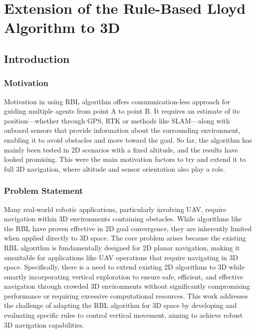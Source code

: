 \chapter{Extension of the Rule-Based Lloyd Algorithm to 3D\label{chap:rbl}}
\section{Introduction}
    \subsection{Motivation}
        Motivation in using \ac{RBL} algorithm offers communication-less approach for guiding multiple agents from point A to point B.
        It requires an estimate of its position—whether through \ac{GPS}, \ac{RTK} or methods like \ac{SLAM}—along with onboard sensors that provide information about the surrounding environment, enabling it to avoid obstacles and move toward the goal.
        So far, the algorithm has mainly been tested in \ac{2D} scenarios with a fixed altitude, and the results have looked promising. 
        This were the main motivation factors to try and extend it to full \ac{3D} navigation, where altitude and sensor orientation also play a role.

    \subsection{Problem Statement}
        Many real-world robotic applications, particularly involving \ac{UAV}, require navigation within \ac{3D} environments containing obstacles. 
        While algorithms like the \ac{RBL} \cite{rbl_paper} have proven effective in \ac{2D} goal convergence, they are inherently limited when applied directly to \ac{3D} space. 
        The core problem arises because the existing \ac{RBL} algorithm is fundamentally designed for \ac{2D} planar navigation, making it unsuitable for applications like UAV operations that require navigating in \ac{3D} space.
        Specifically, there is a need to extend existing \ac{2D} algorithms to \ac{3D} while smartly incorporating vertical exploration to ensure safe, efficient, and effective navigation through crowded 3D environments without significantly compromising performance or requiring excessive computational resources. 
        This work addresses the challenge of adapting the \ac{RBL} algorithm for \ac{3D} space by developing and evaluating specific rules to control vertical movement, aiming to achieve robust 3D navigation capabilities.
        
